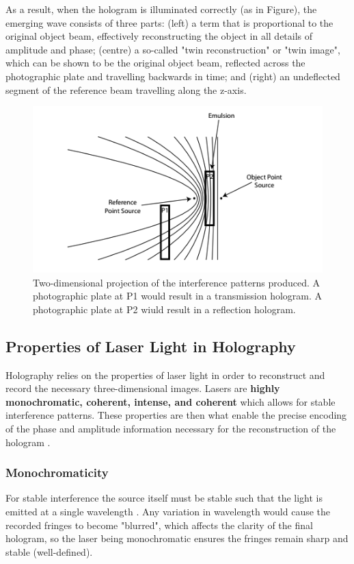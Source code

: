 \documentclass[12pt]{article}
\begin{document}
As a result, when the hologram is illuminated correctly (as in Figure), the emerging wave consists of three parts: (left) a term that is proportional to the original object beam, effectively
reconstructing the object in all details of amplitude and phase; (centre) a so-called "twin reconstruction" or "twin image", which can be shown to be the original object beam, reflected across the
photographic plate and travelling backwards in time; and (right) an undeflected segment of the reference beam travelling along the z-axis.

\begin{figure}[H]
    \centering
    \includegraphics[width=.5\textwidth]{holography1.png}
    \caption{\centering Two-dimensional projection of the interference patterns produced. A photographic plate at P1 would result in a transmission hologram.
    A photographic plate at P2 wiuld result in a reflection hologram. \protect\cite{princetonholo}}
    \label{fig:3}
\end{figure}

\subsection{Properties of Laser Light in Holography}

Holography relies on the properties of laser light in order to reconstruct and record the necessary three-dimensional images. Lasers are \textbf{highly monochromatic, coherent, intense, and coherent} which allows for stable
interference patterns. These properties are then what enable the precise encoding of the phase and amplitude information necessary for the reconstruction of the hologram \cite{UCDholo}.

\subsubsection{Monochromaticity}

For stable interference the source itself must be stable such that the light is emitted at a single wavelength \cite{princelaser}.
Any variation in wavelength would cause the recorded fringes to become "blurred", which affects the clarity of the final hologram, so the laser being monochromatic ensures the fringes remain sharp and stable (well-defined).
\end{document}

